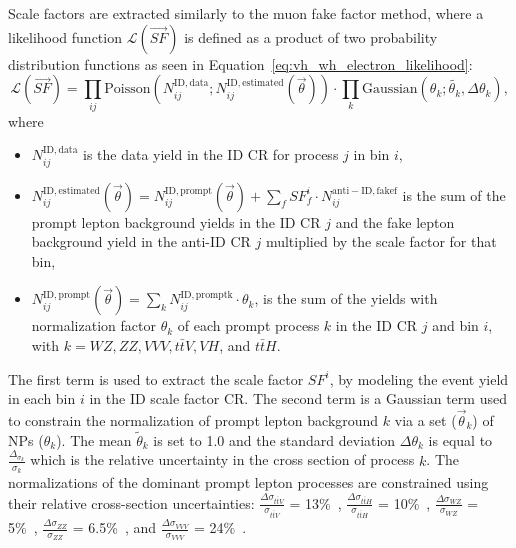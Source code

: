 Scale factors are extracted similarly to the muon fake factor method, where a likelihood function $\mathcal{L}(\vec{SF})$ is defined as a product of two probability distribution functions as seen in Equation~\ref{eq:vh_wh_electron_likelihood}:
\begin{equation}
  \mathcal{L}(\vec{SF}) = \prod_{ij}\mathrm{Poisson}(N_{ij}^{\mathrm{ID, data}}; N_{ij}^{\mathrm{ID, estimated}}(\vec{\theta})) \cdot \prod_{k}\mathrm{Gaussian}(\theta_{k}; \tilde{\theta_{k}}, \Delta{\theta_{k}}),
  \label{eq:vh_wh_electron_likelihood}
\end{equation}
where
\begin{itemize}
  \item $N_{ij}^{\mathrm{ID, data}}$ is the data yield in the ID CR for process $j$ in \pt{} bin $i$,
  \item $N_{ij}^{\mathrm{ID, estimated}}(\vec{\theta}) = N_{ij}^{\mathrm{ID, prompt}}(\vec{\theta}) + \sum_{f}SF^{i}_{f} \cdot N_{ij}^{\mathrm{anti-ID, fake f}}$ is the sum of the prompt lepton background yields in the ID CR $j$ and the fake lepton background yield in the anti-ID CR $j$ multiplied by the scale factor for that \pt{} bin,
  \item $N_{ij}^{\mathrm{ID, prompt}}(\vec{\theta}) = \sum_{k}N_{ij}^{\mathrm{ID, prompt k}} \cdot \theta_{k}$, is the sum of the yields with normalization factor $\theta_{k}$ of each prompt process $k$ in the ID CR $j$ and \pt{} bin $i$, with $k = WZ, ZZ, VVV, t\bar{t}V, VH$, and $t\bar{t}H$.
\end{itemize}
The first term is used to extract the scale factor $SF^{i}$, by modeling the event yield in each \pt{} bin $i$ in the ID scale factor CR\@. The second term is a Gaussian term used to constrain the normalization of prompt lepton background $k$ via a set ($\vec{\theta}_{k}$) of NPs ($\theta_{k}$). The mean $\tilde{\theta}_{k}$ is set to 1.0 and the standard deviation $\Delta{\theta_{k}}$ is equal to $\frac{\Delta_{\sigma_{k}}}{\sigma_{k}}$ which is the relative uncertainty in the cross section of process $k$. The normalizations of the dominant prompt lepton processes are constrained using their relative cross-section uncertainties: $\frac{\Delta\sigma_{t\bar{t}V}}{\sigma_{t\bar{t}V}}$ = 13\%~\cite{ttVNLOTwiki}, $\frac{\Delta\sigma_{t\bar{t}H}}{\sigma_{t\bar{t}H}}$ = 10\%~\cite{CERNYR4Twiki}, $\frac{\Delta\sigma_{WZ}}{\sigma_{WZ}}$ = 5\%~\cite{STDM-2018-03}, $\frac{\Delta\sigma_{ZZ}}{\sigma_{ZZ}}$ = 6.5\%~\cite{ATLAS:2023dew}, and $\frac{\Delta\sigma_{VVV}}{\sigma_{VVV}}$ = 24\%~\cite{STDM-2019-09,ATLAS:2024nab}.

